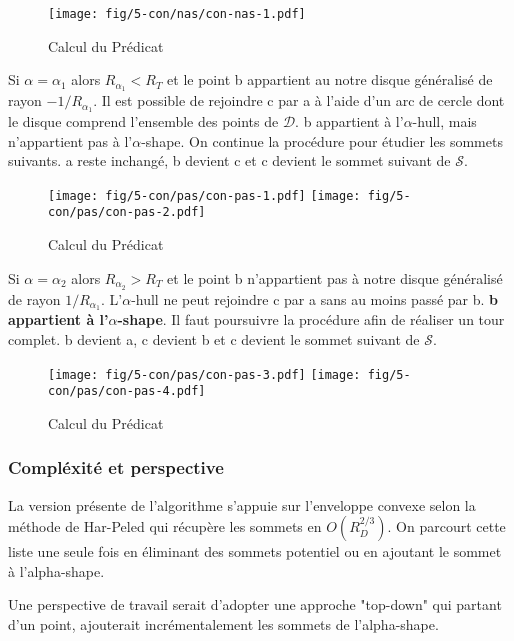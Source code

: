 \begin{figure}[H]
  \centering
  \texttt{[image: fig/5-con/nas/con-nas-1.pdf]}
  \caption{Calcul du Prédicat}
\end{figure}

Si $\alpha = \alpha_{1}$ alors \textbf{$R_{\alpha_{1}} < R_T$} et le point b appartient au notre disque généralisé de rayon $-1/R_{\alpha_{1}}$. Il est possible de rejoindre c par a à l'aide d'un arc de cercle dont le disque comprend l'ensemble des points de $\mathcal{D}$. b appartient à l'$\alpha$-hull, mais n'appartient pas à l'$\alpha$-shape. On continue la procédure pour étudier les sommets suivants. a reste inchangé, b devient c et c devient le sommet suivant de $\mathcal{S}$.

\begin{figure}[H]
  \centering
  \texttt{[image: fig/5-con/pas/con-pas-1.pdf]}
  \texttt{[image: fig/5-con/pas/con-pas-2.pdf]}
  \caption{Calcul du Prédicat}
\end{figure}

Si $\alpha = \alpha_{2}$ alors \textbf{$R_{\alpha_{2}} > R_T$} et le point b n'appartient pas à notre disque généralisé de rayon $1/R_{\alpha_{1}}$. L'$\alpha$-hull ne peut rejoindre c par a sans au moins passé par b. \textbf{b appartient à l'$\alpha$-shape}. Il faut poursuivre la procédure afin de réaliser un tour complet. b devient a, c devient b et c devient le sommet suivant de $\mathcal{S}$.\\

\begin{figure}[H]
  \centering
  \texttt{[image: fig/5-con/pas/con-pas-3.pdf]}
  \texttt{[image: fig/5-con/pas/con-pas-4.pdf]}
  \caption{Calcul du Prédicat}
\end{figure}

\subsubsection{Compléxité et perspective}

La version présente de l'algorithme s'appuie sur l'enveloppe convexe selon la méthode de Har-Peled qui récupère les sommets en $O(R^{2/3}_{D})$. On parcourt cette liste une seule fois en éliminant des sommets potentiel ou en ajoutant le sommet à l'alpha-shape. 

Une perspective de travail serait d'adopter une approche "top-down" qui partant d'un point, ajouterait incrémentalement les sommets de l'alpha-shape. 
